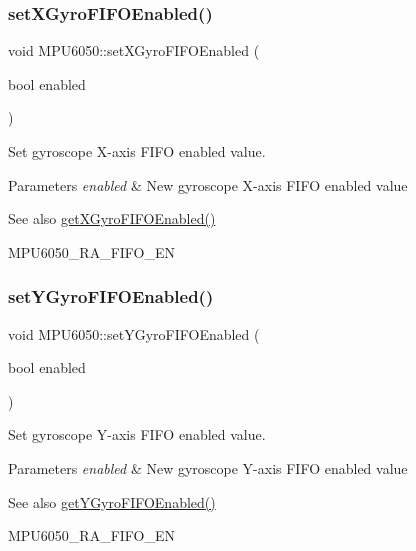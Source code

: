 \subsubsection{\texorpdfstring{setXGyroFIFOEnabled()}{setXGyroFIFOEnabled()}}
{\footnotesize\ttfamily void M\+P\+U6050\+::set\+X\+Gyro\+F\+I\+F\+O\+Enabled (\begin{DoxyParamCaption}\item[{bool}]{enabled }\end{DoxyParamCaption})}

Set gyroscope X-\/axis F\+I\+FO enabled value. 
\begin{DoxyParams}{Parameters}
{\em enabled} & New gyroscope X-\/axis F\+I\+FO enabled value \\
\hline
\end{DoxyParams}
\begin{DoxySeeAlso}{See also}
\mbox{\hyperlink{class_m_p_u6050_ada9a553176b57815f23fb7d71bb85c9d}{get\+X\+Gyro\+F\+I\+F\+O\+Enabled()}} 

M\+P\+U6050\+\_\+\+R\+A\+\_\+\+F\+I\+F\+O\+\_\+\+EN 
\end{DoxySeeAlso}
\mbox{\label{class_m_p_u6050_a16eb12bbf07bc17a9d852941d834175e}} 
\subsubsection{\texorpdfstring{setYGyroFIFOEnabled()}{setYGyroFIFOEnabled()}}
{\footnotesize\ttfamily void M\+P\+U6050\+::set\+Y\+Gyro\+F\+I\+F\+O\+Enabled (\begin{DoxyParamCaption}\item[{bool}]{enabled }\end{DoxyParamCaption})}

Set gyroscope Y-\/axis F\+I\+FO enabled value. 
\begin{DoxyParams}{Parameters}
{\em enabled} & New gyroscope Y-\/axis F\+I\+FO enabled value \\
\hline
\end{DoxyParams}
\begin{DoxySeeAlso}{See also}
\mbox{\hyperlink{class_m_p_u6050_a86c85d5b5c93df82394435b868e17463}{get\+Y\+Gyro\+F\+I\+F\+O\+Enabled()}} 

M\+P\+U6050\+\_\+\+R\+A\+\_\+\+F\+I\+F\+O\+\_\+\+EN 
\end{DoxySeeAlso}
\mbox{\label{class_m_p_u6050_a6d25a21e1673682f096399b719c66d2c}} 
